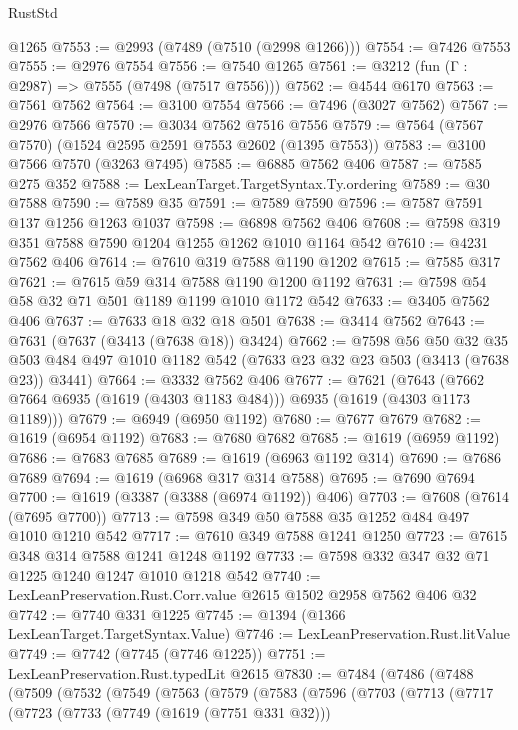\begin{lexlean}{RustStd}
\begin{coremodule}
    @1265
@7553 := @2993 (@7489 (@7510 (@2998 @1266)))
@7554 := @7426 @7553
@7555 := @2976 @7554
@7556 := @7540 @1265
@7561 := @3212 (fun (Γ : @2987) => @7555 (@7498 (@7517 @7556)))
@7562 := @4544 @6170
@7563 := @7561 @7562
@7564 := @3100 @7554
@7566 := @7496 (@3027 @7562)
@7567 := @2976 @7566
@7570 := @3034 @7562 @7516 @7556
@7579 := @7564 (@7567 @7570) (@1524 @2595 @2591 @7553 @2602 (@1395 @7553))
@7583 := @3100 @7566 @7570 (@3263 @7495)
@7585 := @6885 @7562 @406
@7587 := @7585 @275 @352
@7588 := LexLeanTarget.TargetSyntax.Ty.ordering
@7589 := @30 @7588
@7590 := @7589 @35
@7591 := @7589 @7590
@7596 := @7587 @7591 @137 @1256 @1263 @1037
@7598 := @6898 @7562 @406
@7608 := @7598 @319 @351 @7588 @7590 @1204 @1255 @1262 @1010 @1164 @542
@7610 := @4231 @7562 @406
@7614 := @7610 @319 @7588 @1190 @1202
@7615 := @7585 @317
@7621 := @7615 @59 @314 @7588 @1190 @1200 @1192
@7631 := @7598 @54 @58 @32 @71 @501 @1189 @1199 @1010 @1172 @542
@7633 := @3405 @7562 @406
@7637 := @7633 @18 @32 @18 @501
@7638 := @3414 @7562
@7643 := @7631 (@7637 (@3413 (@7638 @18)) @3424)
@7662 := @7598
    @56
    @50
    @32
    @35
    @503
    @484
    @497
    @1010
    @1182
    @542
    (@7633 @23 @32 @23 @503 (@3413 (@7638 @23)) @3441)
@7664 := @3332 @7562 @406
@7677 := @7621
    (@7643 (@7662 @7664 @6935 (@1619 (@4303 @1183 @484))) @6935 (@1619 (@4303 @1173 @1189)))
@7679 := @6949 (@6950 @1192)
@7680 := @7677 @7679
@7682 := @1619 (@6954 @1192)
@7683 := @7680 @7682
@7685 := @1619 (@6959 @1192)
@7686 := @7683 @7685
@7689 := @1619 (@6963 @1192 @314)
@7690 := @7686 @7689
@7694 := @1619 (@6968 @317 @314 @7588)
@7695 := @7690 @7694
@7700 := @1619 (@3387 (@3388 (@6974 @1192)) @406)
@7703 := @7608 (@7614 (@7695 @7700))
@7713 := @7598 @349 @50 @7588 @35 @1252 @484 @497 @1010 @1210 @542
@7717 := @7610 @349 @7588 @1241 @1250
@7723 := @7615 @348 @314 @7588 @1241 @1248 @1192
@7733 := @7598 @332 @347 @32 @71 @1225 @1240 @1247 @1010 @1218 @542
@7740 := LexLeanPreservation.Rust.Corr.value @2615 @1502 @2958 @7562 @406 @32
@7742 := @7740 @331 @1225
@7745 := @1394 (@1366 LexLeanTarget.TargetSyntax.Value)
@7746 := LexLeanPreservation.Rust.litValue
@7749 := @7742 (@7745 (@7746 @1225))
@7751 := LexLeanPreservation.Rust.typedLit @2615
@7830 := @7484
    (@7486
      (@7488
        (@7509
          (@7532
            (@7549
              (@7563
                (@7579
                  (@7583
                    (@7596
                      (@7703
                        (@7713
                          (@7717
                            (@7723
                              (@7733
                                (@7749 (@1619 (@7751 @331 @32)))

\end{coremodule}
\end{lexlean}
